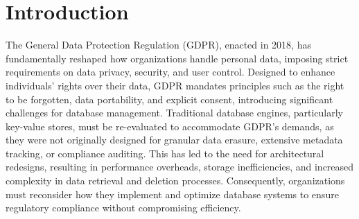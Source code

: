 \chapter{Introduction}\label{chapter:introduction}

The General Data Protection Regulation (GDPR), enacted in 2018, has fundamentally reshaped how organizations handle personal data, imposing strict requirements on data privacy, security, and user control. Designed to enhance individuals' rights over their data, GDPR mandates principles such as the right to be forgotten, data portability, and explicit consent, introducing significant challenges for database management. Traditional database engines, particularly key-value stores, must be re-evaluated to accommodate GDPR’s demands, as they were not originally designed for granular data erasure, extensive metadata tracking, or compliance auditing. This has led to the need for architectural redesigns, resulting in performance overheads, storage inefficiencies, and increased complexity in data retrieval and deletion processes. Consequently, organizations must reconsider how they implement and optimize database systems to ensure regulatory compliance without compromising efficiency.

